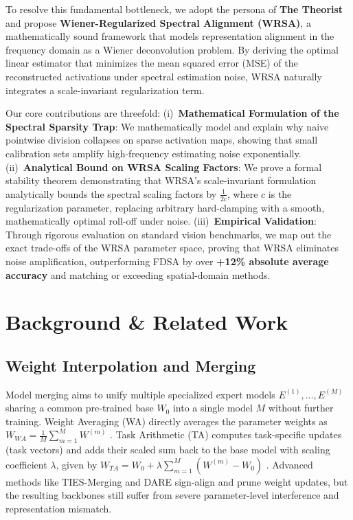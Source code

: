 \documentclass{article}
\theoremstyle{plain}
\theoremstyle{definition}
\theoremstyle{remark}
\begin{document}
To resolve this fundamental bottleneck, we adopt the persona of \textbf{The Theorist} and propose \textbf{Wiener-Regularized Spectral Alignment (WRSA)}, a mathematically sound framework that models representation alignment in the frequency domain as a Wiener deconvolution problem. By deriving the optimal linear estimator that minimizes the mean squared error (MSE) of the reconstructed activations under spectral estimation noise, WRSA naturally integrates a scale-invariant regularization term. 

Our core contributions are threefold:
(i)~\textbf{Mathematical Formulation of the Spectral Sparsity Trap}: We mathematically model and explain why naive pointwise division collapses on sparse activation maps, showing that small calibration sets amplify high-frequency estimating noise exponentially.
(ii)~\textbf{Analytical Bound on WRSA Scaling Factors}: We prove a formal stability theorem demonstrating that WRSA's scale-invariant formulation analytically bounds the spectral scaling factors by $\frac{1}{2c}$, where $c$ is the regularization parameter, replacing arbitrary hard-clamping with a smooth, mathematically optimal roll-off under noise.
(iii)~\textbf{Empirical Validation}: Through rigorous evaluation on standard vision benchmarks, we map out the exact trade-offs of the WRSA parameter space, proving that WRSA eliminates noise amplification, outperforming FDSA by over \textbf{+12\% absolute average accuracy} and matching or exceeding spatial-domain methods.

\section{Background \& Related Work}
\label{sec:background}

\subsection{Weight Interpolation and Merging}
Model merging aims to unify multiple specialized expert models $E^{(1)}, \ldots, E^{(M)}$ sharing a common pre-trained base $W_0$ into a single model $M$ without further training. Weight Averaging (WA) directly averages the parameter weights as $W_{WA} = \frac{1}{M} \sum_{m=1}^M W^{(m)}$ \cite{wortsman2022model}. Task Arithmetic (TA) computes task-specific updates (task vectors) and adds their scaled sum back to the base model with scaling coefficient $\lambda$, given by $W_{TA} = W_0 + \lambda \sum_{m=1}^M \left(W^{(m)} - W_0\right)$ \cite{ilharco2022editing}. Advanced methods like TIES-Merging \cite{yadav2023ties} and DARE \cite{yu2024language} sign-align and prune weight updates, but the resulting backbones still suffer from severe parameter-level interference and representation mismatch.
\end{document}
